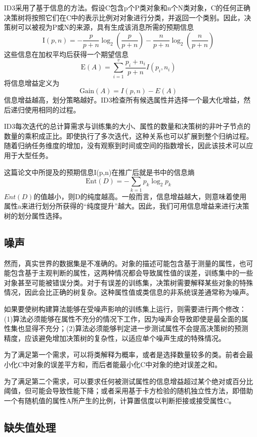 \documentclass[fontset=windows]{article}
\begin{document}
ID3采用了基于信息的方法。假设C包含p个P类对象和n个N类对象，C的任何正确决策树将按照它们在C中的表示比例对对象进行分类，并返回一个类别。因此，决策树可以被视为P或N的来源，具有生成该消息所需的预期信息$$\text{I}\left(p,n\right)=-\frac{p}{p+n}\log_2{\left(\frac{p}{p+n}\right)}-\frac{n}{p+n}\log_2{\left(\frac{n}{p+n}\right)}$$这些信息在加权平均后获得一个期望信息$$\text{E}\left(A\right)=\sum_{i=1}^{v}{\frac{p_i+n_i}{p+n}I(p_i,n_i)}$$将信息增益定义为$$\text{Gain}\left(A\right)=I\left(p,n\right)-E(A)$$信息增益越高，划分策略越好。ID3检查所有候选属性并选择一个最大化增益，然后递归使用相同的过程。

ID3每次迭代的总计算需求与训练集的大小、属性的数量和决策树的非叶子节点的数量的乘积成正比。即使执行了多次迭代，这种关系也可以扩展到整个归纳过程。随着归纳任务维度的增加，没有观察到时间或空间的指数增长，因此该技术可以应用于大型任务。

这篇论文中所提及的预期信息I(p,n)在推广后就是\cite[机器学习]{ref5}书中的信息熵$$\text{Ent}\left(D\right)=-\sum_{k=1}{p_k\log_2{p_k}}$$$Ent(D)$的值越小，则D的纯度越高。一般而言，信息增益越大，则意味着使用属性a来进行划分所获得的“纯度提升”越大。因此，我们可用信息增益来进行决策树的划分属性选择。

\subsection{噪声}

然而，真实世界的数据集是不准确的。对象的描述可能包含基于测量的属性，也可能包含基于主观判断的属性，这两种情况都会导致属性值的误差，训练集中的一些对象甚至可能被错误分类。对于有误差的训练集，决策树需要解释某些对象的特殊情况，因此会比正确的树复杂。这种属性值或类信息的非系统误差通常称为噪声。

如果要使树构建算法能够在受噪声影响的训练集上运行，则需要进行两个修改：(1)算法必须能够在属性不充分的情况下工作，因为噪声会导致即使是最全面的属性集也显得不充分；(2)算法必须能够判定进一步测试属性不会提高决策树的预测精度，应该避免增加决策树的复杂性，以适应单个噪声生成的特殊情况。

为了满足第一个需求，可以将类解释为概率，或者是选择数量较多的类。前者会最小化C中对象的误差平方和，而后者能最小化C中对象的绝对误差之和。

为了满足第二个需求，可以要求任何被测试属性的信息增益超过某个绝对或百分比阈值，但可能会导致性能下降；或者采用基于卡方检验的随机独立性方法，即借助一个有随机值的属性A所产生的比例，计算置信度以判断拒接或接受属性C。

\subsection{缺失值处理}
\end{document}
